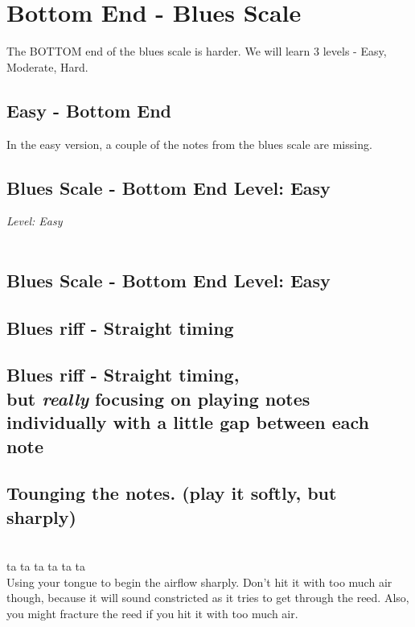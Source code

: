 \newpage    
        \section*{Bottom End - Blues Scale}
        The BOTTOM end of the blues scale is harder. We will learn 3 levels - Easy, Moderate, Hard.
            \subsection*{Easy - Bottom End}
            In the easy version, a couple of the notes from the blues scale are missing.
                
                \subsection*{Blues Scale - Bottom End \Downarrow Level: Easy}
                {\textit{Level: Easy}}\\
                    \4\3\2 \\
                
                \subsection*{Blues Scale - Bottom End \Uparrow Level: Easy}
                    \2 \3 \4
                    
              \subsection*{Blues riff - Straight timing}    
                   \4\3\2\3\4
                   
            \subsection*{Blues riff - Straight timing, \\but \textit{really} focusing on playing notes individually with a little gap between each note}    
                   \4\3\2\3\4   
                   
            \subsection*{Tounging the notes. (play it softly, but sharply)}    
                \4\3\2\3\4          \\
                ta ta ta ta ta ta     \\
                Using your tongue to begin the airflow sharply. Don't hit it with too much air though, because it will sound constricted as it tries to get through the reed. Also, you might fracture the reed if you hit it with too much air. 
                   

